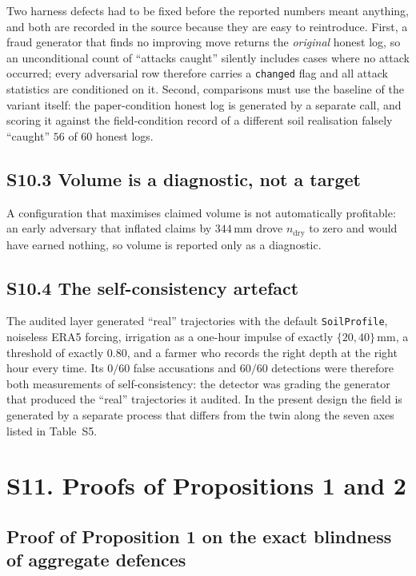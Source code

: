 Two harness defects had to be fixed before the reported numbers meant anything,
and both are recorded in the source because they are easy to reintroduce.
First, a fraud generator that finds no improving move returns the \emph{original}
honest log, so an unconditional count of ``attacks caught'' silently includes
cases where no attack occurred; every adversarial row therefore carries a
\texttt{changed} flag and all attack statistics are conditioned on it. Second,
comparisons must use the baseline of the variant itself: the paper-condition
honest log is generated by a separate call, and scoring it against the
field-condition record of a different soil realisation falsely ``caught'' $56$
of $60$ honest logs.

\subsection*{S10.3 Volume is a diagnostic, not a target}

A configuration that maximises claimed volume is not automatically profitable:
an early adversary that inflated claims by $344$\,mm drove $n_{\mathrm{dry}}$ to
zero and would have earned nothing, so volume is reported only as a diagnostic.

\subsection*{S10.4 The self-consistency artefact}

The audited layer generated ``real'' trajectories with the default \texttt{SoilProfile}, noiseless ERA5 forcing, irrigation as a one-hour
impulse of exactly $\{20,40\}$\,mm, a threshold of exactly $0.80$, and a farmer
who records the right depth at the right hour every time. Its $0/60$ false
accusations and $60/60$ detections were therefore both measurements of
self-consistency: the detector was grading the generator that produced the
``real'' trajectories it audited. In the present
design the field is generated by a separate process that differs from the twin
along the seven axes listed in Table~S5.

\section*{S11. Proofs of Propositions 1 and 2}

\subsection*{Proof of Proposition 1 on the exact blindness of aggregate defences}

